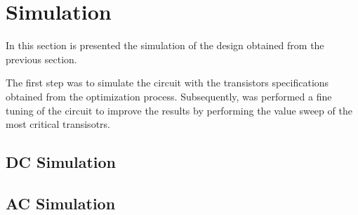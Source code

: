 \section{Simulation}

In this section is presented the simulation of the design obtained from the previous section.

The first step was to simulate the circuit with the transistors specifications obtained from the optimization process. Subsequently, was performed a fine tuning of the circuit to improve the results by performing the value sweep of the most critical transisotrs.

\subsection{DC Simulation}

\subsection{AC Simulation}